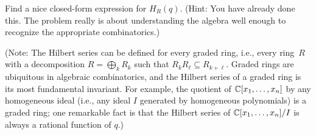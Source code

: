 Find a nice closed-form expression for $H_R(q)$.  (Hint: You have already done this.  The problem really is about understanding the algebra well enough to recognize the appropriate combinatorics.)

(Note: The Hilbert series can be defined for every graded ring, i.e., every ring~$R$ with a decomposition $R=\bigoplus_k R_k$ such that $R_kR_\ell\subseteq R_{k+\ell}$.  Graded rings are ubiquitous in algebraic combinatorics, and the Hilbert series of a graded ring is its most fundamental invariant.  For example, the quotient of $\mathbb{C}[x_1,\dots,x_n]$ by any homogeneous ideal (i.e., any ideal $I$ generated by homogeneous polynomials) is a graded ring; one remarkable fact is that the Hilbert series of $\mathbb{C}[x_1,\dots,x_n]/I$ is always a rational function of $q$.)

